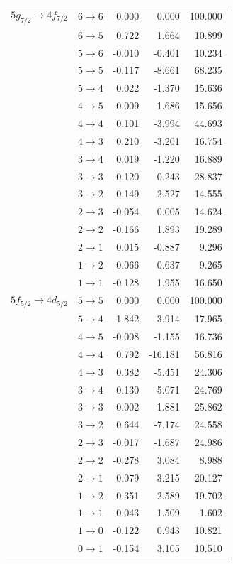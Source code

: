 \begin{table}[b]
\begin{tiny}
\begin{tabular}{cc|rrr}
$5g_{7/2} \rightarrow 4f_{7/2}$  &  $6 \rightarrow 6$  &  0.000  &  0.000  &  100.000\\
&  $6 \rightarrow 5$  &  0.722  &  1.664  &  10.899\\
&  $5 \rightarrow 6$  &  -0.010  &  -0.401  &  10.234\\
&  $5 \rightarrow 5$  &  -0.117  &  -8.661  &  68.235\\
&  $5 \rightarrow 4$  &  0.022  &  -1.370  &  15.636\\
&  $4 \rightarrow 5$  &  -0.009  &  -1.686  &  15.656\\
&  $4 \rightarrow 4$  &  0.101  &  -3.994  &  44.693\\
&  $4 \rightarrow 3$  &  0.210  &  -3.201  &  16.754\\
&  $3 \rightarrow 4$  &  0.019  &  -1.220  &  16.889\\
&  $3 \rightarrow 3$  &  -0.120  &  0.243  &  28.837\\
&  $3 \rightarrow 2$  &  0.149  &  -2.527  &  14.555\\
&  $2 \rightarrow 3$  &  -0.054  &  0.005  &  14.624\\
&  $2 \rightarrow 2$  &  -0.166  &  1.893  &  19.289\\
&  $2 \rightarrow 1$  &  0.015  &  -0.887  &  9.296\\
&  $1 \rightarrow 2$  &  -0.066  &  0.637  &  9.265\\
&  $1 \rightarrow 1$  &  -0.128  &  1.955  &  16.650\\[7pt]

$5f_{5/2} \rightarrow 4d_{5/2}$  &  $5 \rightarrow 5$  &  0.000  &  0.000  &  100.000\\
&  $5 \rightarrow 4$  &  1.842  &  3.914  &  17.965\\
&  $4 \rightarrow 5$  &  -0.008  &  -1.155  &  16.736\\
&  $4 \rightarrow 4$  &  0.792  &  -16.181  &  56.816\\
&  $4 \rightarrow 3$  &  0.382  &  -5.451  &  24.306\\
&  $3 \rightarrow 4$  &  0.130  &  -5.071  &  24.769\\
&  $3 \rightarrow 3$  &  -0.002  &  -1.881  &  25.862\\
&  $3 \rightarrow 2$  &  0.644  &  -7.174  &  24.558\\
&  $2 \rightarrow 3$  &  -0.017  &  -1.687  &  24.986\\
&  $2 \rightarrow 2$  &  -0.278  &  3.084  &  8.988\\
&  $2 \rightarrow 1$  &  0.079  &  -3.215  &  20.127\\
&  $1 \rightarrow 2$  &  -0.351  &  2.589  &  19.702\\
&  $1 \rightarrow 1$  &  0.043  &  1.509  &  1.602\\
&  $1 \rightarrow 0$  &  -0.122  &  0.943  &  10.821\\
&  $0 \rightarrow 1$  &  -0.154  &  3.105  &  10.510
\end{tabular}
\end{tiny}
\end{table}%

